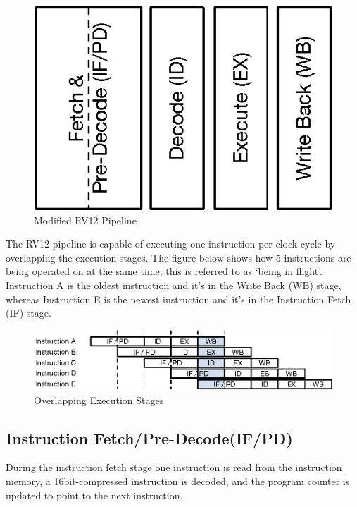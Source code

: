 \begin{figure}[hbt]
  \includegraphics{assets/img/Pipeline-RV12}
  \caption{Modified RV12 Pipeline}
\end{figure}

The RV12 pipeline is capable of executing one instruction per clock cycle by
overlapping the execution stages.  The figure below shows how 5 instructions are
being operated on at the same time; this is referred to as `being in flight'.
Instruction A is the oldest instruction and it's in the Write Back (WB) stage,
whereas Instruction E is the newest instruction and it's in the Instruction
Fetch (IF) stage.

\begin{figure}[hbt]
  \includegraphics{assets/img/Pipeline-Overlap}
  \caption{Overlapping Execution Stages}
\end{figure}

\subsection{Instruction Fetch/Pre-Decode(IF/PD)} \label{instruction-fetchpre-decode-ifpd}

During the instruction fetch stage one instruction is read from the instruction
memory, a 16bit-compressed instruction is decoded, and the program counter is
updated to point to the next instruction.


